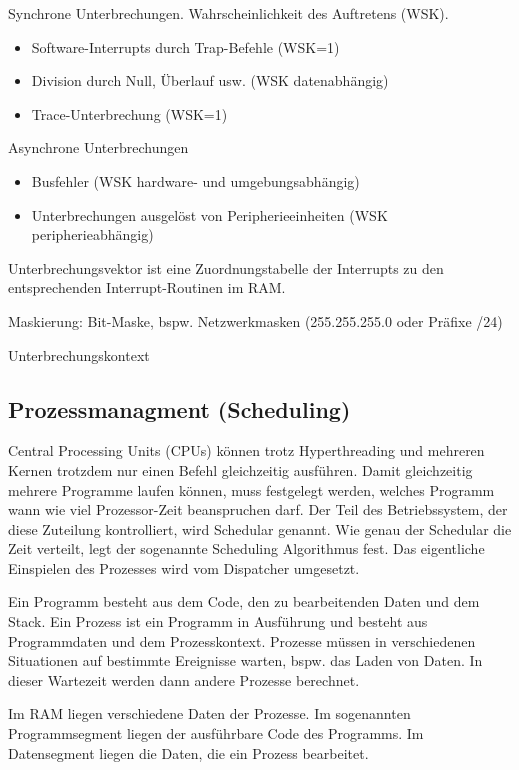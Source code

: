 Synchrone Unterbrechungen. Wahrscheinlichkeit des Auftretens (WSK).
\begin{itemize}
	\item Software-Interrupts durch Trap-Befehle (WSK=1)
	\item Division durch Null, Überlauf usw. (WSK datenabhängig)
	\item Trace-Unterbrechung (WSK=1)	
\end{itemize}
Asynchrone Unterbrechungen
\begin{itemize}
	\item Busfehler (WSK hardware- und umgebungsabhängig)
	\item Unterbrechungen ausgelöst von Peripherieeinheiten (WSK peripherieabhängig)
\end{itemize}

Unterbrechungsvektor ist eine Zuordnungstabelle der Interrupts zu den entsprechenden Interrupt-Routinen im RAM.

Maskierung: Bit-Maske, bspw. Netzwerkmasken (255.255.255.0 oder Präfixe /24)

Unterbrechungskontext


\subsection{Prozessmanagment (Scheduling)}

Central Processing Units (CPUs) können trotz Hyperthreading und mehreren Kernen trotzdem nur einen Befehl gleichzeitig ausführen. Damit gleichzeitig mehrere Programme laufen können, muss festgelegt werden, welches Programm wann wie viel Prozessor-Zeit beanspruchen darf. Der Teil des Betriebssystem, der diese Zuteilung kontrolliert, wird Schedular genannt. Wie genau der Schedular die Zeit verteilt, legt der sogenannte Scheduling Algorithmus fest. Das eigentliche Einspielen des Prozesses wird vom Dispatcher umgesetzt. 

Ein Programm besteht aus dem Code, den zu bearbeitenden Daten und dem Stack. Ein Prozess ist ein Programm in Ausführung und besteht aus Programmdaten und dem Prozesskontext. Prozesse müssen in verschiedenen Situationen auf bestimmte Ereignisse warten, bspw. das Laden von Daten. In dieser Wartezeit werden dann andere Prozesse berechnet.

Im RAM liegen verschiedene Daten der Prozesse. Im sogenannten Programmsegment liegen der ausführbare Code des Programms. Im Datensegment liegen die Daten, die ein Prozess bearbeitet.

